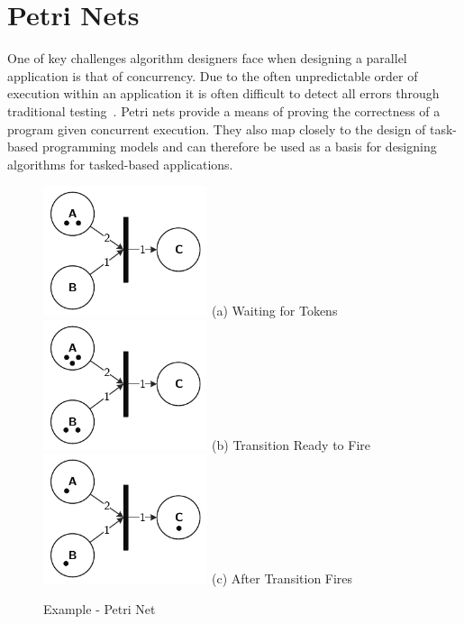 \section{Petri Nets}
\label{sec:petri-nets}
One of key challenges algorithm designers face when designing a parallel 
application is that of concurrency.  Due to the often unpredictable order of
execution within an application it is often difficult to detect all errors 
through traditional testing~\cite{phd-franco}.  Petri nets provide a means 
of proving the correctness of a program given concurrent execution.  They also 
map closely to the design of task-based programming models and can therefore be 
used as a basis for designing algorithms for tasked-based applications.

\begin{figure}[!htb]
  \includegraphics[width=1.9in]{drawings/examples/Petri1.pdf}
  (a) Waiting for Tokens
\endminipage\hfill
{}
  \includegraphics[width=1.9in]{drawings/examples/Petri2.pdf}
  (b) Transition Ready to Fire
\endminipage\hfill
{}%
  \includegraphics[width=1.9in]{drawings/examples/Petri3.pdf}
  (c) After Transition Fires
\endminipage
\caption{Example - Petri Net}
\label{fig:petri}
\end{figure}


